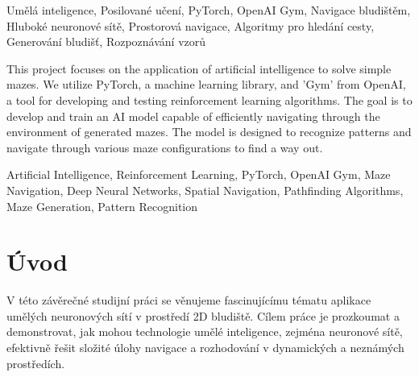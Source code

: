 \documentclass[12pt, a4paper,
twoside,        %
openright
]{report}
\begin{document}

\noindent Umělá inteligence, Posilované učení, PyTorch, OpenAI Gym, Navigace bludištěm, Hluboké neuronové sítě, Prostorová navigace, Algoritmy pro hledání cesty, Generování bludišť, Rozpoznávání vzorů 

\vspace{18pt}


\noindent This project focuses on the application of artificial intelligence to solve simple mazes. We utilize PyTorch, a machine learning library, and 'Gym' from OpenAI, a tool for developing and testing reinforcement learning algorithms. The goal is to develop and train an AI model capable of efficiently navigating through the environment of generated mazes. The model is designed to recognize patterns and navigate through various maze configurations to find a way out.

\vspace{18pt}


\noindent Artificial Intelligence, Reinforcement Learning, PyTorch, OpenAI Gym, Maze Navigation, Deep Neural Networks, Spatial Navigation, Pathfinding Algorithms, Maze Generation, Pattern Recognition 

\clearpage %


\tableofcontents %

\setcounter{page}{1} %

\chapter*{Úvod}
V této závěrečné studijní práci se věnujeme fascinujícímu tématu aplikace umělých neuronových sítí v prostředí 2D bludiště. Cílem práce je prozkoumat a demonstrovat, jak mohou technologie umělé inteligence, zejména neuronové sítě, efektivně řešit složité úlohy navigace a rozhodování v dynamických a neznámých prostředích.
\end{document}
